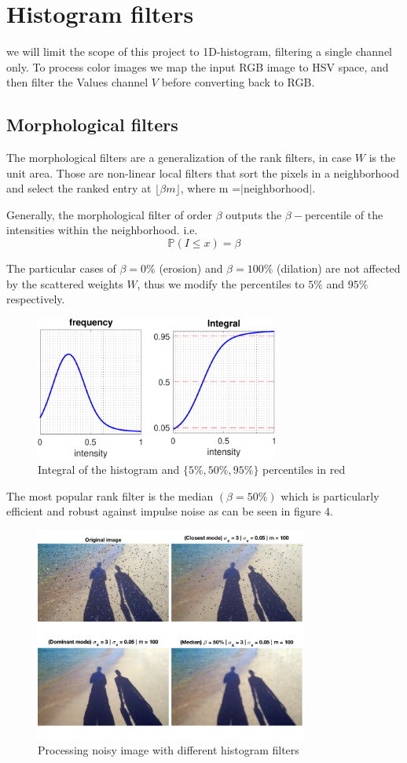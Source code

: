 \documentclass{acmsiggraph}
\begin{document}
\section{Histogram filters}
we will limit the scope of this project to 1D-histogram, filtering a single channel only. To process color images we map the input RGB image to HSV space, and then filter the Values channel $V$ before converting back to RGB.
\subsection{Morphological filters}
The morphological filters are a generalization of the rank filters, in case $W$ is the unit area. Those are non-linear local filters that sort the pixels in a neighborhood and select the ranked entry at $\lfloor \beta m\rfloor$, where m =$|$neighborhood$|$.

Generally, the morphological filter of order $\beta$ outputs the $\beta-$percentile of the intensities within the neighborhood. i.e.
\[\mathbb P(I\leq x) = \beta\]

The particular cases of $\beta = 0\%$ (erosion)
and $\beta = 100\%$ (dilation) are not affected by the scattered weights $W$, thus we modify the percentiles to $5\%$ and $95\%$ respectively. 

\begin{figure}[h]
\centering
\includegraphics[width=8cm]{int}
\caption{Integral of the histogram and $\{5\%, 50\% , 95\%\}$ percentiles in red}
\end{figure}
The most popular rank filter is the median $(\beta = 50\%)$ which is particularly efficient and robust against impulse noise as can be seen in figure 4.
\begin{figure}[h]
\centering
\includegraphics[width=9cm]{noisy}
\caption{Processing noisy image with different histogram filters}
\end{figure}
\end{document}
